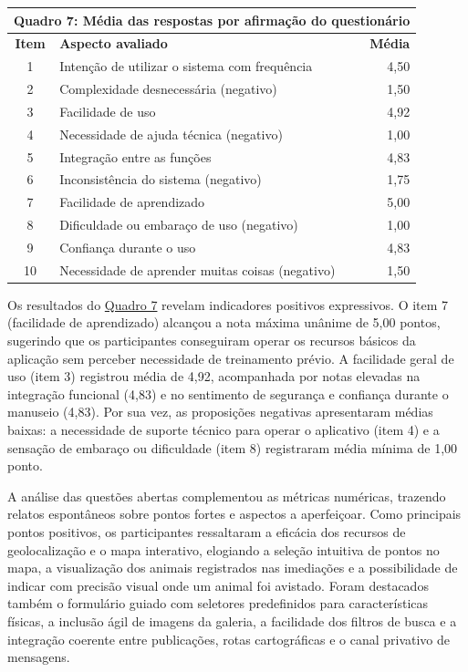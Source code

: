 \begin{table}[H]
    \centering
    \hypertarget{quadro:medias_itens_sus}{}\label{quadro:medias_itens_sus}
    \small
    \renewcommand{\arraystretch}{1.15}
    \begin{tabular}{|c|p{9.0cm}|r|}
        \hline
        \multicolumn{3}{|c|}{\textbf{Quadro 7: Média das respostas por afirmação do questionário}} \\ \hline
        \textbf{Item} & \textbf{Aspecto avaliado} & \textbf{Média} \\ \hline
        1 & Intenção de utilizar o sistema com frequência & 4,50 \\ \hline
        2 & Complexidade desnecessária (negativo) & 1,50 \\ \hline
        3 & Facilidade de uso & 4,92 \\ \hline
        4 & Necessidade de ajuda técnica (negativo) & 1,00 \\ \hline
        5 & Integração entre as funções & 4,83 \\ \hline
        6 & Inconsistência do sistema (negativo) & 1,75 \\ \hline
        7 & Facilidade de aprendizado & 5,00 \\ \hline
        8 & Dificuldade ou embaraço de uso (negativo) & 1,00 \\ \hline
        9 & Confiança durante o uso & 4,83 \\ \hline
        10 & Necessidade de aprender muitas coisas (negativo) & 1,50 \\ \hline
    \end{tabular}
\end{table}

Os resultados do \hyperref[quadro:medias_itens_sus]{Quadro 7} revelam indicadores positivos expressivos. O item 7 (facilidade de aprendizado) alcançou a nota máxima unânime de 5,00 pontos, sugerindo que os participantes conseguiram operar os recursos básicos da aplicação sem perceber necessidade de treinamento prévio. A facilidade geral de uso (item 3) registrou média de 4,92, acompanhada por notas elevadas na integração funcional (4,83) e no sentimento de segurança e confiança durante o manuseio (4,83). Por sua vez, as proposições negativas apresentaram médias baixas: a necessidade de suporte técnico para operar o aplicativo (item 4) e a sensação de embaraço ou dificuldade (item 8) registraram média mínima de 1,00 ponto.

A análise das questões abertas complementou as métricas numéricas, trazendo relatos espontâneos sobre pontos fortes e aspectos a aperfeiçoar. Como principais pontos positivos, os participantes ressaltaram a eficácia dos recursos de geolocalização e o mapa interativo, elogiando a seleção intuitiva de pontos no mapa, a visualização dos animais registrados nas imediações e a possibilidade de indicar com precisão visual onde um animal foi avistado. Foram destacados também o formulário guiado com seletores predefinidos para características físicas, a inclusão ágil de imagens da galeria, a facilidade dos filtros de busca e a integração coerente entre publicações, rotas cartográficas e o canal privativo de mensagens.


